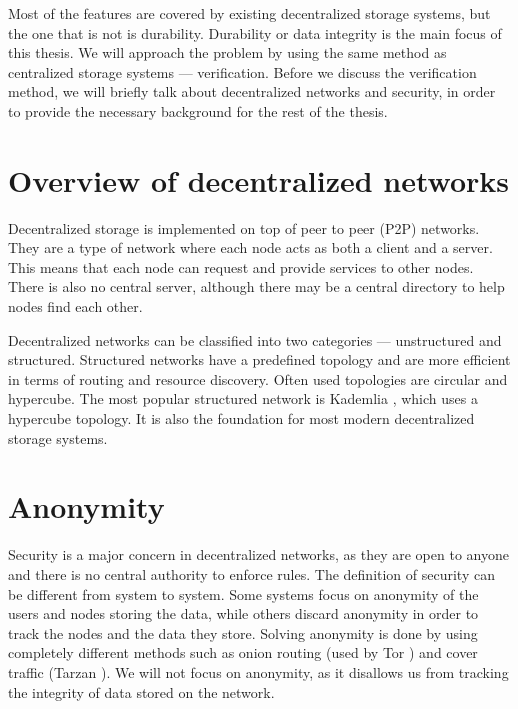 Most of the features are covered by existing decentralized storage systems, but the one that is not is durability.
Durability or data integrity is the main focus of this thesis.
We will approach the problem by using the same method as centralized storage systems --- verification.
Before we discuss the verification method, we will briefly talk about decentralized networks and security,
in order to provide the necessary background for the rest of the thesis.


\section{Overview of decentralized networks}

Decentralized storage is implemented on top of peer to peer (P2P) networks.
They are a type of network where each node acts as both a client and a server.
This means that each node can request and provide services to other nodes.
There is also no central server, although there may be a central directory to help nodes find each other.

Decentralized networks can be classified into two categories --- unstructured and structured.
Structured networks have a predefined topology and are more efficient in terms of routing and resource discovery.
Often used topologies are circular and hypercube.
The most popular structured network is Kademlia \cite{kademlia}, which uses a hypercube topology.
It is also the foundation for most modern decentralized storage systems.

\section{Anonymity}

Security is a major concern in decentralized networks,
as they are open to anyone and there is no central authority to enforce rules.
The definition of security can be different from system to system.
Some systems focus on anonymity of the users and nodes storing the data,
while others discard anonymity in order to track the nodes and the data they store.
Solving anonymity is done by using completely different methods such as
onion routing (used by Tor \cite{tor}) and cover traffic (Tarzan \cite{tarzan}).
We will not focus on anonymity, as it disallows us from tracking the integrity of data stored on the network.


